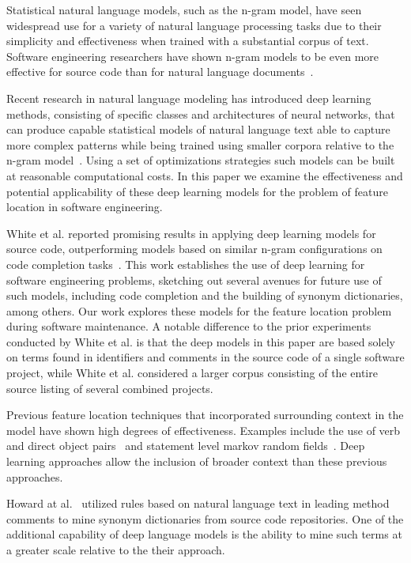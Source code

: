


%
%
Statistical natural language models, such as the n-gram model, have
seen widespread use for a variety of natural language processing tasks
due to their simplicity and effectiveness when trained with a
substantial corpus of text. Software engineering researchers have
shown n-gram models to be even more effective for source code than for
natural language documents~\cite{hindle_naturalness_2012}.


Recent research in natural language modeling has introduced deep
learning methods, consisting of specific classes and architectures of
neural networks, that can produce capable statistical models of
natural language text able to capture more complex patterns while
being trained using smaller corpora relative to the n-gram
model~\cite{mikolov_distributed_2013,le_distributed_2014}. Using a set
of optimizations strategies such models can be built at reasonable
computational costs. In this paper we examine the effectiveness and
potential applicability of these deep learning models for the problem
of feature location in software engineering.



White et al. reported promising results in applying deep learning
models for source code, outperforming models based on similar n-gram
configurations on code completion tasks~\cite{white_toward_2015}. This
work establishes the use of deep learning for software engineering
problems, sketching out several avenues for future use of such models,
including code completion and the building of synonym dictionaries,
among others. Our work explores these models for the feature location
problem during software maintenance. A notable difference to the prior
experiments conducted by White et al. is that the deep models in this
paper are based solely on terms found in identifiers and comments in
the source code of a single software project, while White et
al. considered a larger corpus consisting of the entire source listing
of several combined projects.



Previous feature location techniques that incorporated surrounding
context in the model have shown high degrees of
effectiveness. Examples include the use of verb and direct object
pairs~\cite{shepherd_using_2007} and statement level markov random
fields~\cite{hill_use_2014}. Deep learning approaches allow the inclusion
of broader context than these previous approaches.

Howard at al.~\cite{howard_automatically_2013} utilized rules based on
natural language text in leading method comments to mine synonym
dictionaries from source code repositories. One of the additional
capability of deep language models is the ability to mine such terms
at a greater scale relative to the their approach.
